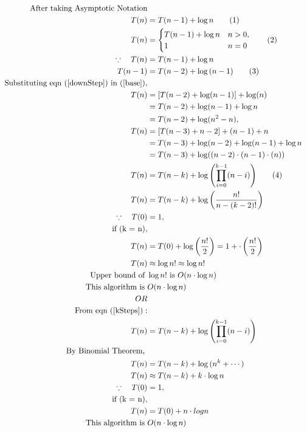 \documentclass[]{article}
\begin{document}
\begin{align*}
    \text{After taking Asymptotic Notation}\\
    T(n) &= T(n - 1) + \log{n} \tag{1} \label{base}\\
    T(n) &=
    \begin{cases}
        T(n - 1) + \log{n} & n > 0, \\
        1 & n = 0
    \end{cases} \tag{2} \\  
    \because \hspace{10pt} T(n) &= T(n - 1) + \log{n}  \\
    T(n - 1) &= T(n - 2) + \log{(n - 1)} \tag{3} \label{downStep}\\
    \text{Substituting eqn } (\ref{downStep}) \text{ in } (\ref{base}),  \\
    T(n)&= [T(n - 2) + \log(n - 1)] + \log(n)\\ 
        &= T(n - 2) + \log(n-1) + \log{n}\\ &= T(n-2) + \log (n^2-n), \\
    T(n)&= [T(n - 3) + n - 2] + (n-1) + n \\
        &= T(n - 3) + \log(n-2) + \log(n-1) + \log n\\
        &= T(n-3) + \log ((n-2) \cdot (n-1) \cdot(n)) \\
    T(n) &= T(n-k) + \log{\left(\prod_{i=0}^{k-1} (n-i) \right)} \label{kSteps} \tag{4}\\
    T(n) &= T(n-k) + \log \left(\frac{n!}{n-(k-2)!}\right)\\
    \because \hspace{10pt} T(0) &= 1, \\
    \text{if (k = n)}, \\
    T(n) &= T(0) + \log \left( \frac{n!}{2}\right) = 1 + \cdot \left( \frac{n!}{2}\right) \\
    T(n) &\approx \log{n!}  \approx \log{n!}\\
    \text{Upper bound of }& \log{n!}  \text{ is }O(n \cdot \log{n})\\
    \text{This algorithm is } & O(n \cdot \log{n})\\
    OR & \\
    \text{From eqn (\ref{kSteps})}:\\
    T(n) &= T(n-k) + \log{\left(\prod_{i=0}^{k-1} (n-i) \right)}\\
    \text{By Binomial Theorem, }\\
    T(n) &= T(n-k) + \log{(n^k + \cdots) }\\
    T(n) &\approx T(n-k) + k \cdot \log {n}\\
    \because \hspace{10pt} T(0) &= 1, \\
    \text{if (k = n)}, \\
    T(n) &= T(0) + n \cdot log{n}\\
    \text{This algorithm is } & O(n \cdot \log{n})
\end{align*}
\end{document}
